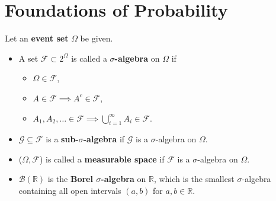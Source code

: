 \documentclass[10pt]{article}
\theoremstyle{definition}
\newenvironment{definition*}[1]{%
  \IfBlankTF{#1}
    {\renewcommand{\themanualdefinitioninner}{\unskip}}
    {\renewcommand\themanualdefinitioninner{#1}}%
  \manualdefinitioninner
}{\endmanualdefinitioninner}
\begin{document}
\section{Foundations of Probability}

\begin{definition*}{}Let an \textbf{event set} $\Omega$ be given.
    \leavevmode
    \begin{itemize}
        \item A set $\mathcal{F} \subset 2^{\Omega}$ is called a \textbf{$\sigma$-algebra} on $\Omega$ if
        \begin{itemize}
            \item[(1)] $\Omega \in \mathcal{F}$,
            \item[(2)] $A \in \mathcal{F} \implies A^c \in \mathcal{F}$,
            \item[(3)] $A_1, A_2, \ldots \in \mathcal{F} \implies \bigcup_{i=1}^{\infty} A_i \in \mathcal{F}$.
        \end{itemize}
        \item $\mathcal{G} \subseteq \mathcal{F}$ is a \textbf{sub-$\sigma$-algebra} if $\mathcal{G}$ is a $\sigma$-algebra on $\Omega$.
        \item ($\Omega, \mathcal{F}$) is called a \textbf{measurable space} if $\mathcal{F}$ is a $\sigma$-algebra on $\Omega$.
        \item $\mathcal{B}(\mathbb{R})$ is the \textbf{Borel $\sigma$-algebra} on $\mathbb{R}$, which is the smallest $\sigma$-algebra containing all open intervals $(a, b)$ for $a, b \in \mathbb{R}$.
    \end{itemize}
\end{definition*}
\end{document}
